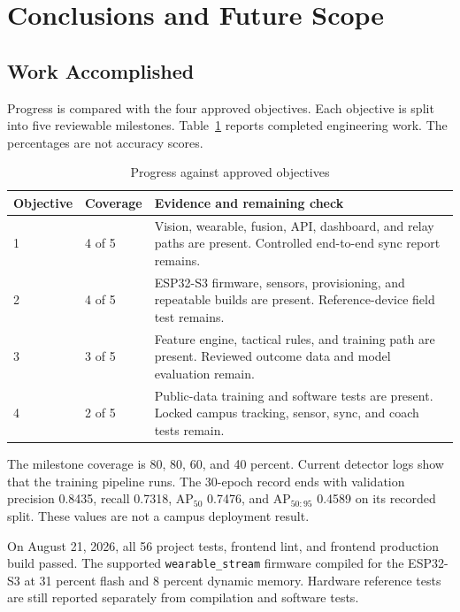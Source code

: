 \section{Conclusions and Future Scope}

\subsection{Work Accomplished}
Progress is compared with the four approved objectives. Each objective is split
into five reviewable milestones. Table~\ref{tab:objective_progress} reports
completed engineering work. The percentages are not accuracy scores.

\begin{table}[H]
\centering
\caption{Progress against approved objectives}
\label{tab:objective_progress}
\small
\begin{tabularx}{\textwidth}{p{0.8in}p{0.85in}X}
\toprule
\textbf{Objective} & \textbf{Coverage} & \textbf{Evidence and remaining check}\\
\midrule
1 & 4 of 5 & Vision, wearable, fusion, API, dashboard, and relay paths are present. Controlled end-to-end sync report remains.\\
2 & 4 of 5 & ESP32-S3 firmware, sensors, provisioning, and repeatable builds are present. Reference-device field test remains.\\
3 & 3 of 5 & Feature engine, tactical rules, and training path are present. Reviewed outcome data and model evaluation remain.\\
4 & 2 of 5 & Public-data training and software tests are present. Locked campus tracking, sensor, sync, and coach tests remain.\\
\bottomrule
\end{tabularx}
\end{table}

The milestone coverage is 80, 80, 60, and 40 percent. Current detector logs
show that the training pipeline runs. The 30-epoch record ends with validation
precision 0.8435, recall 0.7318, AP$_{50}$ 0.7476, and AP$_{50:95}$ 0.4589 on
its recorded split. These values are not a campus deployment result.

On August 21, 2026, all 56 project tests, frontend lint, and frontend production
build passed. The supported \texttt{wearable\_stream} firmware compiled for the
ESP32-S3 at 31 percent flash and 8 percent dynamic memory. Hardware reference
tests are still reported separately from compilation and software tests.

